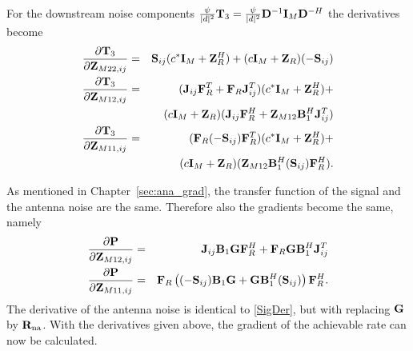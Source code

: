For the downstream noise components $\frac{\psi}{|d|^2}\mathbf{T}_3=\frac{\psi}{|d|^2}\mathbf{D}^{-1}\mathbf{I}_M\mathbf{D}^{{-H}}$ the derivatives become
\begin{eqnarray}
\frac{\partial \mathbf{T}_3}{\partial \mathbf{Z}_{M22,ij}}&=&\mathbf{S}_{ij}(c^*\mathbf{I}_M+\mathbf{Z}_{R}^H)+ 
(c\mathbf{I}_M+\mathbf{Z}_{R})(-\mathbf{S}_{ij}) \nonumber\\
\frac{\partial \mathbf{T}_3}{\partial \mathbf{Z}_{M12,ij}}&=&(\mathbf{J}_{ij}\mathbf{F}_R^T+\mathbf{F}_R\mathbf{J}_{ij}^T)
(c^*\mathbf{I}_M+\mathbf{Z}_R^H)+ \nonumber \\
 && (c\mathbf{I}_M+\mathbf{Z}_R) 
(\mathbf{J}_{ij}\mathbf{F}_R^H+\mathbf{Z}_{M12}\mathbf{B}_1^H\mathbf{J}_{ij}^T)  \nonumber \\
\frac{\partial \mathbf{T}_3}{\partial \mathbf{Z}_{M11,ij}}&=& (\mathbf{F}_R(-\mathbf{S}_{ij})\mathbf{F}_R^T)(c^*\mathbf{I}_M+\mathbf{Z}_R^H)+   \nonumber \\
&&  (c\mathbf{I}_M+\mathbf{Z}_R)(\mathbf{Z}_{M12}\mathbf{B}_1^H(\mathbf{S}_{ij})\mathbf{F}_R^H).
\label{ShortenedPostLNA}
\end{eqnarray}

As mentioned in Chapter~\ref{sec:ana_grad}, the transfer function of the signal and the antenna noise are the same.
Therefore also the gradients become the same, namely
\begin{eqnarray}
\frac{\partial \mathbf{P}}{\partial \mathbf{Z}_{M12,ij}}&=&\mathbf{J}_{ij}\mathbf{B}_1\mathbf{G} \mathbf{F}_R^H+ 
 \mathbf{F}_R\mathbf{G} \mathbf{B}_1^H\mathbf{J}_{ij}^T \nonumber\\
\frac{\partial \mathbf{P}}{\partial \mathbf{Z}_{M11,ij}}&=&\mathbf{F}_R\left((-\mathbf{S}_{ij})\mathbf{B}_1\mathbf{G} + \mathbf{G}\mathbf{B}_1^H(\mathbf{S}_{ij}) \right)\mathbf{F}_R^H.
\label{SigDer}
\end{eqnarray}
The derivative of the antenna noise is identical to \eqref{SigDer}, but with replacing $\mathbf{G}$ by $\mathbf{R}_{\text{na}}$. With the derivatives given above, the gradient of the achievable rate can now be calculated.






